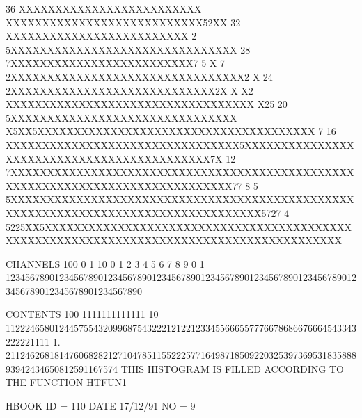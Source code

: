 \begin{Listing}
       36                          XXXXXXXXXXXXXXXXXXXXXXXXX           XXXXXXXXXXXXXXXXXXXXXXXXXXX52XX
       32                          XXXXXXXXXXXXXXXXXXXXXXXXX    2     5XXXXXXXXXXXXXXXXXXXXXXXXXXXXXXX
       28                         7XXXXXXXXXXXXXXXXXXXXXXXXX7 5 X 7  2XXXXXXXXXXXXXXXXXXXXXXXXXXXXXXXX2 X
       24                       2XXXXXXXXXXXXXXXXXXXXXXXXXXXX2X X X2 XXXXXXXXXXXXXXXXXXXXXXXXXXXXXXXXXX X25
       20                      5XXXXXXXXXXXXXXXXXXXXXXXXXXXXXXX X5XX5XXXXXXXXXXXXXXXXXXXXXXXXXXXXXXXXXXXXXX 7
       16                      XXXXXXXXXXXXXXXXXXXXXXXXXXXXXXXX5XXXXXXXXXXXXXXXXXXXXXXXXXXXXXXXXXXXXXXXXXXX7X
       12                     7XXXXXXXXXXXXXXXXXXXXXXXXXXXXXXXXXXXXXXXXXXXXXXXXXXXXXXXXXXXXXXXXXXXXXXXXXXXXXX77
        8                 5 5XXXXXXXXXXXXXXXXXXXXXXXXXXXXXXXXXXXXXXXXXXXXXXXXXXXXXXXXXXXXXXXXXXXXXXXXXXXXXXXXXX5727
        4            5225XX5XXXXXXXXXXXXXXXXXXXXXXXXXXXXXXXXXXXXXXXXXXXXXXXXXXXXXXXXXXXXXXXXXXXXXXXXXXXXXXXXXXXXXXXX
 
 CHANNELS 100   0                                                                                                  1   
           10   0        1         2         3         4         5         6         7         8         9         0   
            1   1234567890123456789012345678901234567890123456789012345678901234567890123456789012345678901234567890   
 
 CONTENTS 100                          1111111111111                                                                
           10                 112224658012445755432099687543222121221233455666557776678686676664543343222221111     
            1.       21124626818147606828212710478511552225771649871850922032539736953183588893942434650812591167574
\finalnewpage
 THIS HISTOGRAM IS FILLED ACCORDING TO THE FUNCTION HTFUN1                       
 
 HBOOK     ID =       110                                        DATE  17/12/91              NO =   9
 

\end{Listing}
